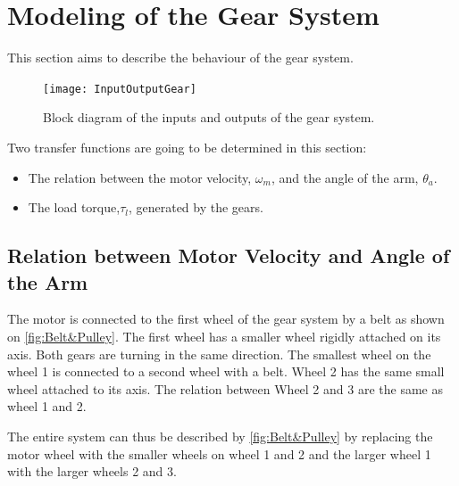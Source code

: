 \newpage
\graphicspath{{figures/modeling/gearTrain/}}
\section{Modeling of the Gear System}\label{sec:ModGearSys}
This section aims to describe the behaviour of the gear system. 

\begin{figure}[htbp]
	\centering
	\texttt{[image: InputOutputGear]}
	\caption{Block diagram of the inputs and outputs of the gear system.}
	\label{fig:GearSystemDiagram}
\end{figure}
\linebreak
\startexplain
{}
\stopexplain

Two transfer functions are going to be determined in this section: 
\begin{itemize}[noitemsep]
\item The relation between the motor velocity, $\omega_m$, and the angle of the arm, $\theta_a$.
\item The load torque,$\tau_l$, generated by the gears.
\end{itemize}

\subsection{Relation between Motor Velocity and Angle of the Arm}
The motor is connected to the first wheel of the gear system by a belt as shown on \autoref{fig:Belt&Pulley}. The first wheel has a smaller wheel rigidly attached on its axis. Both gears are turning in the same direction. The smallest wheel on the wheel 1 is connected to a second wheel with a belt. Wheel 2 has the same small wheel attached to its axis. The relation between Wheel 2 and 3 are the same as wheel 1 and 2.

The entire system can thus be described by \autoref{fig:Belt&Pulley} by replacing the motor wheel with the smaller wheels on wheel 1 and 2 and the larger wheel 1 with the larger wheels 2 and 3.

